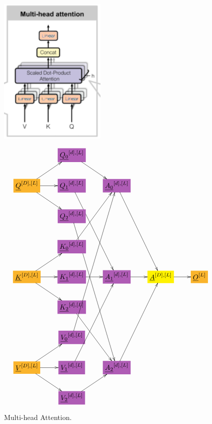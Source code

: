 \documentclass[12pt]{article}
\begin{document}
\begin{figure}[h!]\centering
\begin{minipage}{.5\linewidth}
\includegraphics[width=2in]{multi-head-att.png}
\end{minipage}%
\begin{minipage}{.5\linewidth}
$$\xymatrix{
&*+[F*:Orchid]{\underline{Q_0}^{[d],[L]}}\ar[dr]&&&
\\
*+[F*:Dandelion]{\underline{Q}^{[D], [L]}}\ar[ur]\ar[r]\ar[dr]&*+[F*:Orchid]{\underline{Q_1}^{[d],[L]}}\ar[dddr]&*+[F*:Orchid]{\underline{A_0}^{[d],[L]}}\ar[dddr]&&
\\
&*+[F*:Orchid]{\underline{Q_2}^{[d],[L]}}\ar[dddddr]&&&
\\
&*+[F*:Orchid]{\underline{K_0}^{[d],[L]}}\ar[uur]&&&
\\
*+[F*:Dandelion]{\underline{K}^{[D], [L]}}\ar[ur]\ar[r]\ar[dr]&*+[F*:Orchid]{\underline{K_1}^{[d],[L]}}\ar[r]&*+[F*:Orchid]{\underline{A_1}^{[d],[L]}}\ar[r]&*+[F*:yellow]{\underline{A}^{[D],[L]}}\ar[r]&*+[F*:Dandelion]{\underline{O}^{[L]}}
\\
&*+[F*:Orchid]{\underline{K_2}^{[d],[L]}}\ar[ddr]&&&
\\
&*+[F*:Orchid]{\underline{V_0}^{[d],[L]}}\ar[uuuuur]&&&
\\
*+[F*:Dandelion]{\underline{V}^{[D], [L]}}\ar[ur]\ar[r]\ar[dr]&*+[F*:Orchid]{\underline{V_1}^{[d],[L]}}\ar[uuur]&*+[F*:Orchid]{\underline{A_2}^{[d],[L]}}\ar[uuur]&&
\\
&*+[F*:Orchid]{\underline{V_2}^{[d],[L]}}\ar[ur]&&&
}$$
\end{minipage}
\caption{Multi-head Attention.}
\label{fig-texnn-for-multi-head-att}
\end{figure}
\end{document}
